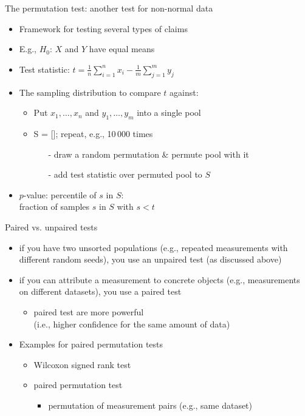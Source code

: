\begin{frame}[c]{The permutation test: another test for non-normal data}

\begin{itemize}
	\item Framework for testing several types of claims
	\item E.g., $H_0$: $X$ and $Y$ have \alert{equal means}
	\item Test statistic: \alert{$t = \frac{1}{n}\sum_{i=1}^n x_i  - 
		\frac{1}{m}\sum_{j=1}^m y_j$}
	\pause
	\medskip
	\item The sampling distribution to compare $t$ against:
	\begin{itemize}
		\item Put $x_1, \dots, x_n$ and $y_1, \dots, y_m$ into a single pool
		\item S = []; repeat, e.g., 10\,000 times
		\begin{itemize}
			\item[-] draw a random permutation \& permute pool with it
			\item[-] add test statistic over permuted pool to $S$
		\end{itemize}
	\end{itemize}
	\pause
	\medskip
	\item $p$-value: percentile of $s$ in $S$:\\
	fraction of samples $s$ in $S$ with $s < t$
	
\end{itemize}

\end{frame}
\begin{frame}[c]{Paired vs. unpaired tests}

\begin{itemize}
	\item if you have two unsorted populations (e.g., repeated measurements with different random seeds), you use an unpaired test (as discussed above)
	\item if you can attribute a measurement to concrete objects (e.g., measurements on different datasets), you use a paired test
	\begin{itemize}
		\item paired test are more powerful\\
		(i.e., higher confidence for the same amount of data)
	\end{itemize}
    \item Examples for paired permutation tests
    \begin{itemize}
    	\item Wilcoxon signed rank test
    	\item paired permutation test
    	\begin{itemize}
    		\item permutation of measurement pairs (e.g., same dataset)
    	\end{itemize}
    \end{itemize}
\end{itemize}

\end{frame}
